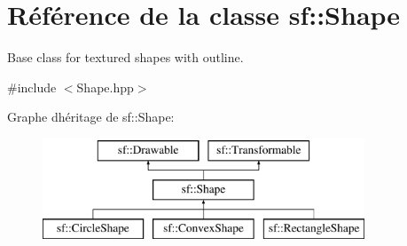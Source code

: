 \hypertarget{classsf_1_1Shape}{}\section{Référence de la classe sf\+:\+:Shape}
\label{classsf_1_1Shape}


Base class for textured shapes with outline.  




{\ttfamily \#include $<$Shape.\+hpp$>$}

Graphe d\textquotesingle{}héritage de sf\+:\+:Shape\+:\begin{figure}[H]
\begin{center}
\leavevmode
\includegraphics[height=3.000000cm]{classsf_1_1Shape}
\end{center}
\end{figure}
